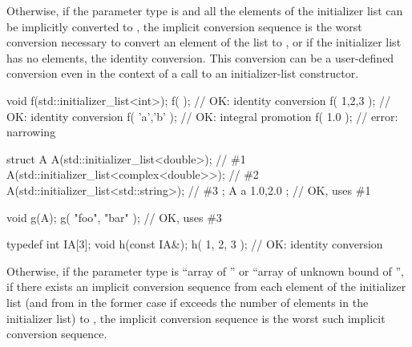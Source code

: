 \pnum
Otherwise, if the parameter type is 
and all the elements
of the initializer list can be implicitly converted to , the implicit
conversion sequence is the worst conversion necessary to convert an element of
the list to , or if the initializer list has no elements, the identity
conversion. This conversion can be a user-defined conversion even in
the context of a call to an initializer-list constructor.
\begin{example}
\begin{codeblock}
void f(std::initializer_list<int>);
f( {} );                        // OK:  identity conversion
f( {1,2,3} );                   // OK:  identity conversion
f( {'a','b'} );                 // OK:  integral promotion
f( {1.0} );                     // error: narrowing

struct A {
  A(std::initializer_list<double>);             // \#1
  A(std::initializer_list<complex<double>>);    // \#2
  A(std::initializer_list<std::string>);        // \#3
};
A a{ 1.0,2.0 };                 // OK, uses \#1

void g(A);
g({ "foo", "bar" });            // OK, uses \#3

typedef int IA[3];
void h(const IA&);
h({ 1, 2, 3 });                 // OK: identity conversion
\end{codeblock}
\end{example}

\pnum
Otherwise, if the parameter type is ``array of  ''
or ``array of unknown bound of '',
if there exists an implicit conversion sequence
from each element of the initializer list
(and from \tcode{\{\}} in the former case
if  exceeds the number of elements in the initializer list)
to , the implicit conversion sequence is
the worst such implicit conversion sequence.

